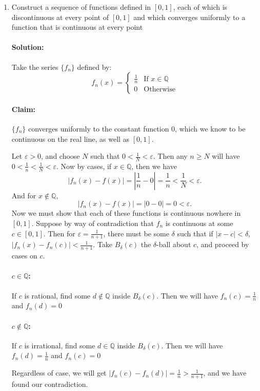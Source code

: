\documentclass{article}
\begin{document}
\begin{enumerate}
\item Construct a sequence of functions defined in $[0,1]$, each of which is discontinuous at every point of $[0,1]$ and which converges uniformly to a function that is continuous at every point 

  \paragraph{Solution: }Take the series $\{f_n\} $ defined by:
  \[
    f_n(x)=\begin{cases}
      \frac{1}{n}&\text{If } x\in \mathbb{Q}\\
      0&\text{Otherwise}
    \end{cases}
  \] 
  \paragraph{Claim:}  $\{f_n\} $ converges uniformly to the constant function $0$, which we know to be continuous on the real line, as well as $[0,1]$. 

  Let $\varepsilon>0$, and choose $N$ such that $0<\frac{1}{N}<\varepsilon$.
  Then any $n\geq N$ will have $0<\frac{1}{n}<\frac{1}{N}<\varepsilon$. Now by cases, if $x\in \mathbb{Q}$, then we have 
  \[
  |f_n(x)-f(x)|=\left|\frac{1}{n}-0\right|=\frac{1}{n}<\frac{1}{N}<\varepsilon
  .\] 
  And for $x\not\in \mathbb{Q}$, 
\[
  |f_n(x)-f(x)|=\left|0-0\right|=0<\varepsilon
.\] 
Now we must show that each of these functions is continuous nowhere in $[0,1]$.  Suppose by way of contradiction that $f_n$ is continuous at some $c\in [0,1]$. Then for $\varepsilon=\frac{1}{n+1}$, there must be some $\delta$ such that if $|x-c|<\delta$, $|f_n(x)-f_n(c)|<\frac{1}{n+1}$. Take $B_\delta(c)$ the $\delta$-ball about $c$, and proceed by cases on $c$.
\paragraph{$c\in \mathbb{Q}$:} If $c$ is rational, find some $d\not\in\mathbb{Q} $ inside $B_{\delta}(c)$. Then we will have $f_n(c)=\frac{1}{n}$ and $f_n(d)=0$
\paragraph{$c\not\in \mathbb{Q}$:} If $c$ is irrational, find some $d\in\mathbb{Q}$ inside $B_{\delta}(c)$. Then we will have $f_n(d)=\frac{1}{n}$ and $f_n(c)=0$

Regardless of case, we will get $|f_n(c)-f_n(d)|=\frac{1}{n}>\frac{1}{n+1}$, and we have found our contradiction.


\end{enumerate}
\end{document}
